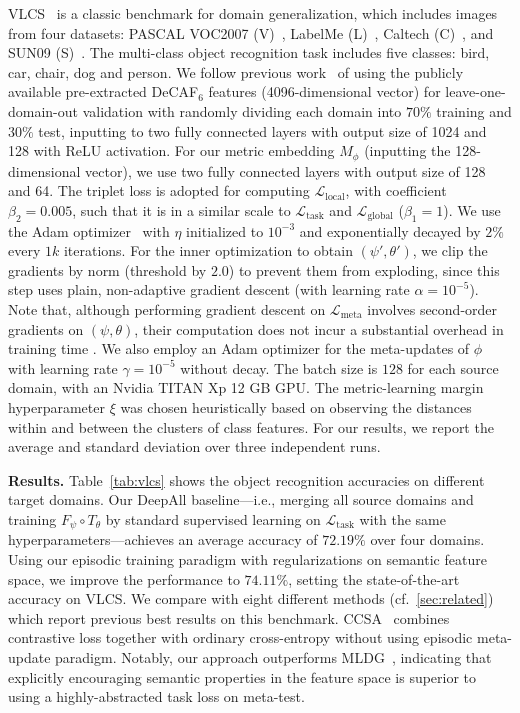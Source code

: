 \documentclass{article}
\newcommand{\TaskLoss}{\mathcal{L}_\mathrm{task}}
\newcommand{\LabelLoss}{\mathcal{L}_\mathrm{global}}
\newcommand{\MetricLoss}{\mathcal{L}_\mathrm{local}}
\newcommand{\MetaLoss}{\mathcal{L}_\mathrm{meta}}
\begin{document}
VLCS~\citep{fang2013unbiased} is a classic benchmark for domain generalization, which includes images from four datasets: PASCAL VOC2007 (V)~\citep{everingham2010pascal}, LabelMe (L)~\citep{russell2008labelme}, Caltech (C)~\citep{fei2007learning}, and SUN09 (S)~\citep{choi2010exploiting}. The multi-class object recognition task includes five classes: bird, car, chair, dog and person.
We follow previous work~\citep{carlucci2019domain,li2019episodic,motiian2017unified} of using the publicly available pre-extracted DeCAF$_{6}$ features (4096-dimensional vector) for leave-one-domain-out validation with randomly dividing each domain into $70\%$ training and $30\%$ test, inputting to two fully connected layers with output size of 1024 and 128 with ReLU activation.
For our metric embedding $M_\phi$ (inputting the 128-dimensional vector), we use two fully connected layers with output size of 128 and 64. The triplet loss is adopted for computing $\MetricLoss$, with coefficient $\beta_2=0.005$, such that it is in a similar scale to $\TaskLoss$ and $\LabelLoss$ ($\beta_1=1$).
We use the Adam optimizer~\citep{kingma2015adam} with $\eta$ initialized to $10^{-3}$ and exponentially decayed by $2\%$ every $1k$ iterations.
For the inner optimization to obtain $(\psi',\theta')$, we clip the gradients by norm (threshold by $2.0$) to prevent them from exploding, since this step uses plain, non-adaptive gradient descent (with learning rate $\alpha=10^{-5}$).
Note that, although performing gradient descent on $\MetaLoss$ involves second-order gradients on $(\psi,\theta)$, their computation does not incur a substantial overhead in training time \citep{finn2017model}.
We also employ an Adam optimizer for the meta-updates of $\phi$ with learning rate $\gamma=10^{-5}$ without decay.
The batch size is $128$ for each source domain, with an Nvidia TITAN Xp 12 GB GPU.
The metric-learning margin hyperparameter $\xi$ was chosen heuristically based on observing the distances within and between the clusters of class features. For our results, we report the average and standard deviation over three independent runs.

\textbf{Results.} Table~\ref{tab:vlcs} shows the object recognition accuracies on different target domains. Our DeepAll baseline---i.e., merging all source domains and training $F_\psi \! \circ \! T_\theta$ by standard supervised learning on $\TaskLoss$ with the same hyperparameters---achieves an average accuracy of $72.19\%$ over four domains. Using our episodic training paradigm with regularizations on semantic feature space, we improve the performance to $74.11\%$, setting the
state-of-the-art accuracy on VLCS.
We compare with eight different methods (cf.~\cref{sec:related}) which report previous best results on this benchmark.
CCSA~\citep{motiian2017unified} combines contrastive loss together with ordinary cross-entropy without using episodic meta-update paradigm.
Notably, our approach outperforms MLDG~\cite{li2018learning}, indicating that explicitly encouraging semantic properties in the feature space is superior to using a highly-abstracted task loss on meta-test.
\end{document}
